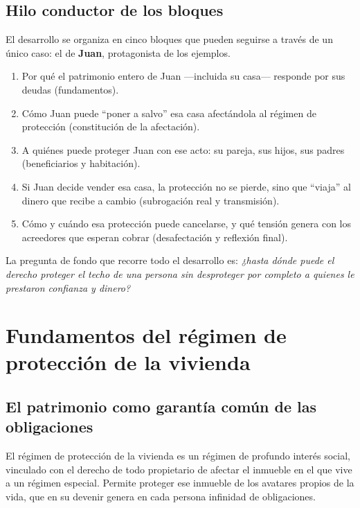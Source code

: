 \documentclass[12pt,oneside]{book}
\begin{document}
\section{Hilo conductor de los bloques}

El desarrollo se organiza en cinco bloques que pueden seguirse a trav\'es de un \'unico caso: el de \textbf{Juan}, protagonista de los ejemplos.

\begin{enumerate}
    \item Por qu\'e el patrimonio entero de Juan ---incluida su casa--- responde por sus deudas (fundamentos).
    \item C\'omo Juan puede ``poner a salvo'' esa casa afect\'andola al r\'egimen de protecci\'on (constituci\'on de la afectaci\'on).
    \item A qui\'enes puede proteger Juan con ese acto: su pareja, sus hijos, sus padres (beneficiarios y habitaci\'on).
    \item Si Juan decide vender esa casa, la protecci\'on no se pierde, sino que ``viaja'' al dinero que recibe a cambio (subrogaci\'on real y transmisi\'on).
    \item C\'omo y cu\'ando esa protecci\'on puede cancelarse, y qu\'e tensi\'on genera con los acreedores que esperan cobrar (desafectaci\'on y reflexi\'on final).
\end{enumerate}

La pregunta de fondo que recorre todo el desarrollo es: \textit{¿hasta d\'onde puede el derecho proteger el techo de una persona sin desproteger por completo a quienes le prestaron confianza y dinero?}

\chapter[Fundamentos del r\'egimen]{Fundamentos del r\'egimen de protecci\'on de la vivienda}

\section{El patrimonio como garant\'ia com\'un de las obligaciones}

El r\'egimen de protecci\'on de la vivienda es un r\'egimen de profundo inter\'es social, vinculado con el derecho de todo propietario de afectar el inmueble en el que vive a un r\'egimen especial. Permite proteger ese inmueble de los avatares propios de la vida, que en su devenir genera en cada persona infinidad de obligaciones.
\end{document}

